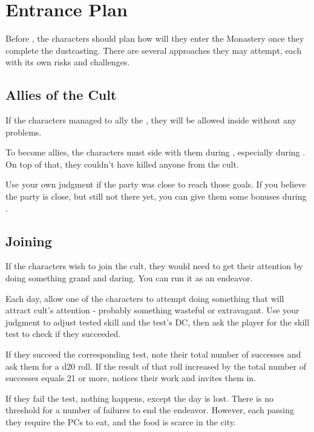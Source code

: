 \section{Entrance Plan}
\label{sec:cityEscapePlan}

Before , the characters should plan how will they enter the Monastery once they complete the dustcasting. There are several approaches they may attempt, each with its own risks and challenges.



\subsection{Allies of the Cult}

If the characters managed to ally the \npcFractionCult{}, they will be allowed inside without any problems.

To become allies, the characters must side with them during , especially during . On top of that, they couldn't have killed anyone from the cult. 

Use your own judgment if the party was close to reach those goals. If you believe the party is close, but still not there yet, you can give them some bonuses during .




\subsection{Joining \npcFractionCult{}}
\label{ssec:cityEscapePlanJoin}

If the characters wish to join the cult, they would need to get their attention by doing something grand and daring. You can run it as an endeavor.

Each day, allow one of the characters to attempt doing something that will attract cult's attention - probably something wasteful or extravagant. Use your judgment to adjust tested skill and the test's DC, then ask the player for the skill test to check if they succeeded.

If they succeed the corresponding test, note their total number of successes and ask them for a d20 roll. If the result of that roll increased by the total number of successes equals 21 or more, \npcFractionCult{} notices their work and invites them in.

If they fail the test, nothing happens, except the day is lost. There is no threshold for a number of failures to end the endeavor. However, each passing they require the PCs to eat, and the food is scarce in the city.

